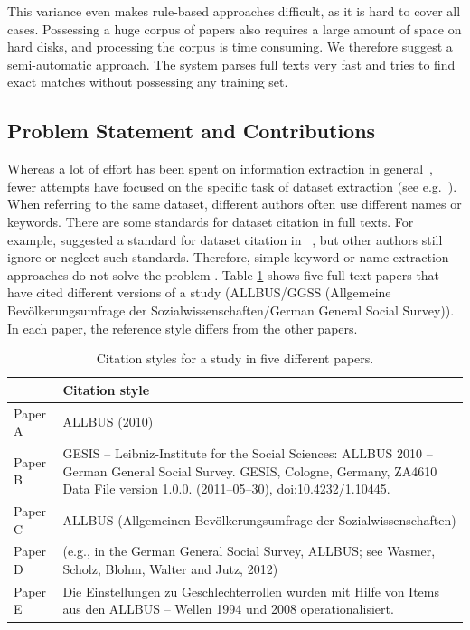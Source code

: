 \documentclass{IOS-Book-Article}
\begin{document}
This variance even makes rule-based approaches difficult, as it is hard to cover all cases. Possessing a huge corpus of papers also requires a large amount of space on hard disks, and processing the corpus is time consuming.
We therefore suggest a semi-automatic approach. The system parses full texts very fast and tries to find exact matches without possessing any training set. 

\subsection{Problem Statement and Contributions}
Whereas a lot of effort has been spent on information extraction in general~\citep{Sarawagi2007}, fewer attempts have focused on the specific task of dataset extraction (see e.g.~\citep{MeiyuLu2012}). When referring to the same dataset, different authors often use different names or keywords. There are some standards for dataset citation in full texts. For example, \citeauthor{altman2007proposed} suggested a standard for dataset citation in ~\citeyearpar{altman2007proposed}, but other authors still ignore or neglect such standards. Therefore, simple keyword or name extraction approaches do not solve the problem \citep{Nadeau2007}. Table \ref{table:citation-variety} shows five full-text papers that have cited different versions of a study (ALLBUS/GGSS (Allgemeine Bev\"olkerungsumfrage der Sozialwissenschaften/German General Social Survey)). In each paper, the reference style differs from the other papers. 

\begin{table}[h!]
	\renewcommand{\arraystretch}{2}
	\centering
	\begin{tabular}{p{2.5cm}p{7cm}}
		\hline
		& Citation style \\
		\hline
		Paper A  & ALLBUS (2010)\\
		
		Paper B  & GESIS -- Leibniz-Institute for the Social Sciences: ALLBUS 2010 -- German General Social Survey. GESIS, Cologne, Germany, ZA4610 Data File version 1.0.0. (2011--05--30), doi:10.4232/1.10445. \\ 
		
		Paper C & ALLBUS (Allgemeinen Bev\"olkerungsumfrage der Sozialwissenschaften)\\
		
		Paper D & (e.g., in the German General Social Survey, ALLBUS; see Wasmer, Scholz, Blohm, Walter and Jutz, 2012)\\
		
		Paper E & Die Einstellungen zu Geschlechterrollen wurden mit Hilfe von Items aus den ALLBUS -- Wellen 1994 und 2008 operationalisiert.\\\hline
	\end{tabular}
	\caption{Citation styles for a study in five different papers.}
	\label{table:citation-variety}
\end{table}
\end{document}
